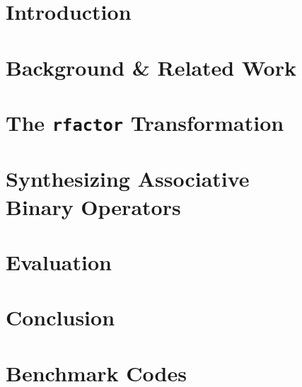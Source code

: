 \documentclass[10pt]{main}
\newcommand{\code}[1]{\texttt{#1}}
\begin{document}
%
%
\printccsdesc


\section{Introduction}
\label{introduction}


\vspace*{-5pt}
\section{Background \& Related Work}
\label{background}


\section{The \code{rfactor} Transformation}
\label{assoc_red}


\section{Synthesizing Associative\\
Binary Operators}
\label{synthesize}


\section{Evaluation}
\label{evaluation}


\section{Conclusion}
\label{conclusion}



%
%

\appendix
\section*{Benchmark Codes}

\end{document}
